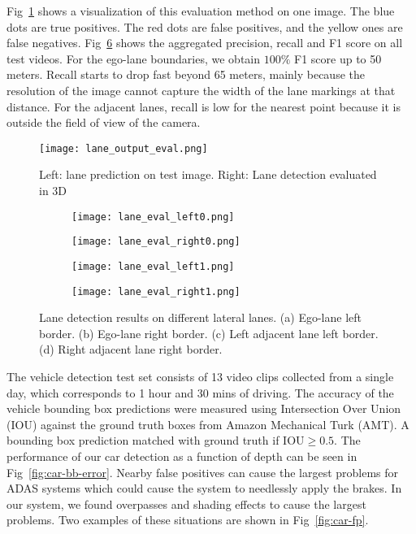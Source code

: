 \documentclass[journal]{IEEEtran}
\begin{document}
Fig~\ref{fig:lane-output-eval} shows a visualization of this evaluation method on one image. The blue dots are true positives. The red dots are false positives, and the yellow ones are false negatives. Fig~\ref{fig:lane-eval-plot} shows the aggregated precision, recall and F1 score on all test videos. For the ego-lane boundaries, we obtain $100\%$ F1 score up to 50 meters. Recall starts to drop fast beyond 65 meters, mainly because the resolution of the image cannot capture the width of the lane markings at that distance. For the adjacent lanes, recall is low for the nearest point because it is outside the field of view of the camera.

\begin{figure}[tb]
  \centering
    \texttt{[image: lane\_output\_eval.png]}
 \caption{Left: lane prediction on test image. Right: Lane detection evaluated in 3D}
 \label{fig:lane-output-eval}
\end{figure}

\begin{figure}[tb]
  \centering
    \begin{subfigure}[b]{1.6in}
      \texttt{[image: lane\_eval\_left0.png]}
      \caption{}
      \label{fig:lane-eval-left0}
    \end{subfigure}%
    \begin{subfigure}[b]{1.6in}
      \texttt{[image: lane\_eval\_right0.png]}
      \caption{}
      \label{fig:lane-eval-right0}
    \end{subfigure}%

    \begin{subfigure}[b]{1.6in}%
      \texttt{[image: lane\_eval\_left1.png]}
      \caption{}
      \label{fig:lane-eval-left1}
    \end{subfigure}%
    \begin{subfigure}[b]{1.6in}%
      \texttt{[image: lane\_eval\_right1.png]}
      \caption{}
      \label{fig:lane-eval-right1}
    \end{subfigure}%
 \caption{Lane detection results on different lateral lanes. (a) Ego-lane left border. (b) Ego-lane right border. (c) Left adjacent lane left border. (d) Right adjacent lane right border.}
 \label{fig:lane-eval-plot}
\end{figure}

The vehicle detection test set consists of 13 video clips collected from a single day, which corresponds to 1 hour and 30 mins of driving. The accuracy of the vehicle bounding box predictions were measured using Intersection Over Union (IOU) against the ground truth boxes from Amazon Mechanical Turk (AMT). A bounding box prediction matched with ground truth if IOU$\geq0.5$. The performance of our car detection as a function of depth can be seen in Fig~\ref{fig:car-bb-error}. Nearby false positives can cause the largest problems for ADAS systems which could cause the system to needlessly apply the brakes. In our system, we found overpasses and shading effects to cause the largest problems. Two examples of these situations are shown in Fig~\ref{fig:car-fp}.
\end{document}
